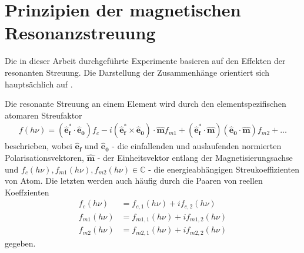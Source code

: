 \chapter{Prinzipien der magnetischen Resonanzstreuung}
\label{text:streuung}
Die in dieser Arbeit durchgeführte Experimente basieren auf den Effekten der resonanten Streuung. Die Darstellung der Zusammenhänge orientiert sich  hauptsächlich auf \cite{kortright_resonant_2013}. 

\noindent
Die resonante Streuung an einem Element wird durch den elementspezifischen atomaren Streufaktor
\begin{align}
f(h\nu) = (\mathbf{\hat{e}_f^*} \cdot \mathbf{\hat{e}_0})f_c - i(\mathbf{\hat{e}_f^*} \times \mathbf{\hat{e}_0})\cdot\mathbf{\hat{m}}f_{m1} +  (\mathbf{\hat{e}_f^*} \cdot \mathbf{\hat{m}})(\mathbf{\hat{e}_0}\cdot\mathbf{\hat{m}})f_{m2} + \dots
\label{eq:atomfaktoren}
\end{align}
beschrieben, wobei $\mathbf{\hat{e}_f}$ und $\mathbf{\hat{e}_0}$ - die einfallenden und auslaufenden normierten Polarisationsvektoren, $\mathbf{\hat{m}}$ - der Einheitsvektor entlang der Magnetisierungsachse und $f_c(h\nu), f_{m1}(h\nu), f_{m2}(h\nu) \in \mathbb{C}$ - die energieabhängigen Streukoeffizienten von Atom. Die letzten werden auch häufig durch die Paaren von reellen Koeffzienten
\begin{equation}
    \begin{split}
    f_c(h\nu) &= f_{c,1}(h\nu) + if_{c,2}(h\nu)\\
    f_{m1}(h\nu) &= f_{m1,1}(h\nu) + if_{m1,2}(h\nu)\\
    f_{m2}(h\nu) &= f_{m2,1}(h\nu) + if_{m2,2}(h\nu)
\end{split}
\label{eq:komplex_paar}
\end{equation}
gegeben.

